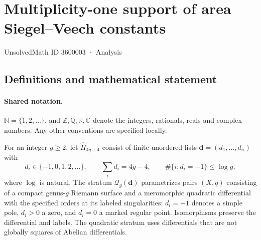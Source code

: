 \documentclass[11pt]{article}
\begin{document}
\setcounter{section}{3600002}
\section{Multiplicity-one support of area Siegel–Veech constants}\label{3600003}
{\small\sffamily UnsolvedMath ID 3600003 · Analysis}
\subsection{Definitions and mathematical statement}

\paragraph{Shared notation.}$\mathbb N=\{1,2,\ldots\}$, and $\mathbb Z,\mathbb Q,\mathbb R,\mathbb C$ denote the integers, rationals, reals and complex numbers. Any other conventions are specified locally.


For an integer $g\ge2$, let $\widehat\Pi_{4g-4}$ consist of finite unordered lists $\boldsymbol d=(d_1,\ldots,d_n)$ with
\[
 d_i\in\{-1,0,1,2,\ldots\},\qquad\sum_i d_i=4g-4,\qquad
 \#\{i:d_i=-1\}\le\log g,
\]
where $\log$ is natural. The stratum $\mathcal Q_g(\boldsymbol d)$ parametrizes pairs $(X,q)$ consisting of a compact genus-$g$ Riemann surface and a meromorphic quadratic differential with the specified orders at its labeled singularities: $d_i=-1$ denotes a simple pole, $d_i>0$ a zero, and $d_i=0$ a marked regular point. Isomorphisms preserve the differential and labels. The quadratic stratum uses differentials that are not globally squares of Abelian differentials.
\end{document}
